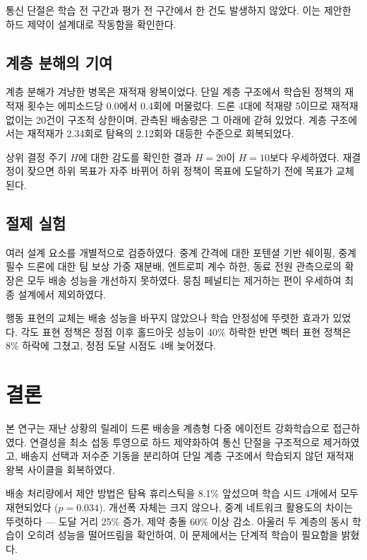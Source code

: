 \documentclass[12pt]{article}
\begin{document}
통신 단절은 학습 전 구간과 평가 전 구간에서 한 건도 발생하지 않았다. 이는 제안한 하드 제약이
설계대로 작동함을 확인한다.

\subsection{계층 분해의 기여}

계층 분해가 겨냥한 병목은 재적재 왕복이었다. 단일 계층 구조에서 학습된 정책의 재적재 횟수는
에피소드당 0.0에서 0.4회에 머물렀다. 드론 4대에 적재량 5이므로 재적재 없이는 20건이 구조적
상한이며, 관측된 배송량은 그 아래에 갇혀 있었다. 계층 구조에서는 재적재가 2.34회로 탐욕의
2.12회와 대등한 수준으로 회복되었다.

상위 결정 주기 $H$에 대한 감도를 확인한 결과 $H=20$이 $H=10$보다 우세하였다. 재결정이 잦으면
하위 목표가 자주 바뀌어 하위 정책이 목표에 도달하기 전에 목표가 교체된다.

\subsection{절제 실험}

여러 설계 요소를 개별적으로 검증하였다. 중계 간격에 대한 포텐셜 기반 쉐이핑, 중계 필수 드론에
대한 팀 보상 가중 재분배, 엔트로피 계수 하한, 동료 전원 관측으로의 확장은 모두 배송 성능을
개선하지 못하였다. 뭉침 페널티는 제거하는 편이 우세하여 최종 설계에서 제외하였다.

행동 표현의 교체는 배송 성능을 바꾸지 않았으나 학습 안정성에 뚜렷한 효과가 있었다. 각도 표현
정책은 정점 이후 홀드아웃 성능이 40\% 하락한 반면 벡터 표현 정책은 8\% 하락에 그쳤고, 정점 도달
시점도 4배 늦어졌다.

\section{결론}

본 연구는 재난 상황의 릴레이 드론 배송을 계층형 다중 에이전트 강화학습으로 접근하였다.
연결성을 최소 섭동 투영으로 하드 제약화하여 통신 단절을 구조적으로 제거하였고, 배송지 선택과
저수준 기동을 분리하여 단일 계층 구조에서 학습되지 않던 재적재 왕복 사이클을 회복하였다.

배송 처리량에서 제안 방법은 탐욕 휴리스틱을 8.1\% 앞섰으며 학습 시드 4개에서 모두 재현되었다
($p=0.034$). 개선폭 자체는 크지 않으나, 중계 네트워크 활용도의 차이는 뚜렷하다 --- 도달 거리
25\% 증가, 제약 충돌 60\% 이상 감소. 아울러 두 계층의 동시 학습이 오히려 성능을 떨어뜨림을
확인하여, 이 문제에서는 단계적 학습이 필요함을 밝혔다.
\end{document}
